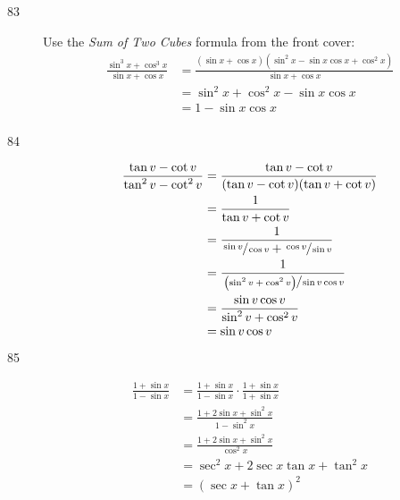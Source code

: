 \documentclass{exam}
\begin{document}
\begin{description}
      \item[83] 
        Use the {\em Sum of Two Cubes} formula from the front cover:
        \begin{align*}
          \frac{\sin^3 x + \cos^3 x}{\sin x + \cos x} & = \frac{(\sin x + \cos x) \left( \sin^2 x - \sin x \cos x + \cos^2 x \right)}{\sin x + \cos x} \\
                                                      & = \sin^2 x + \cos^2 x - \sin x \cos x  \\
                                                      & = 1 - \sin x \cos x  \\
        \end{align*}

      \item[84] 
        \begin{align*}
          \frac{\tan v - \cot v}{\tan^2 v - \cot^2 v} & = \frac{\tan v - \cot v}{( \tan v - \cot v )( \tan v + \cot v )} \\
                                                      & = \frac{1}{\tan v + \cot v} \\
                                                      & = \frac{1}{\sfrac{\sin v}{\cos v} + \sfrac{\cos v}{\sin v}} \\
                                                      & = \frac{1}{\sfrac{\left( \sin^2 v + \cos^2 v \right)}{\sin v \cos v}} \\
                                                      & = \frac{\sin v \cos v}{\sin^2 v + \cos^2 v} \\
                                                      & = \sin v \cos v \\
        \end{align*}

      \item[85] 
        \begin{align*}
          \frac{1 + \sin x}{1 - \sin x} & = \frac{1 + \sin x}{1 - \sin x} \cdot \frac{1 + \sin x}{1 + \sin x} \\
                                        & = \frac{1 + 2 \sin x + \sin^2 x}{1 - \sin^2 x} \\
                                        & = \frac{1 + 2 \sin x + \sin^2 x}{\cos^2 x} \\
                                        & = \sec^2 x + 2 \sec x \tan x + \tan^2 x \\
                                        & = (\sec x + \tan x)^2 \\
        \end{align*}


\end{description}
\end{document}
